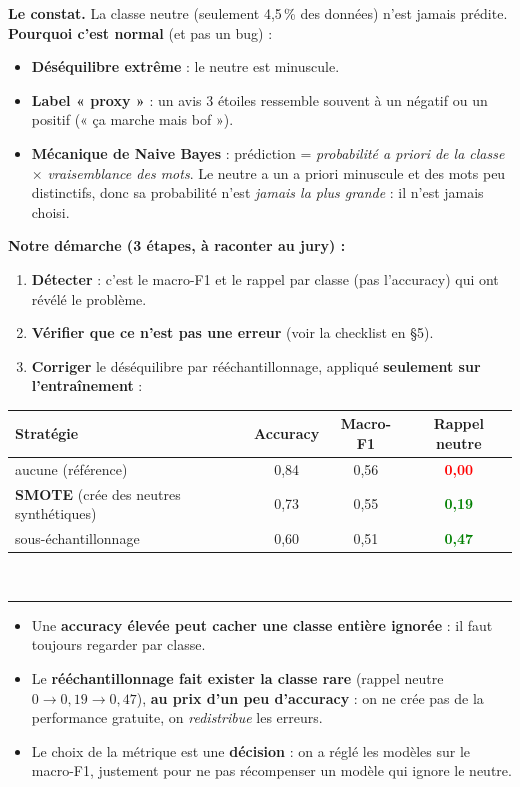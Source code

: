 \documentclass[10.5pt,a4paper]{article}
\newcommand{\sect}[1]{\vspace{0.3em}{\color{primary}\large\bfseries #1}\\[-0.4em]
  {\color{accent}\rule{\linewidth}{1pt}}\par}
\begin{document}
\textbf{Le constat.} La classe neutre (seulement 4,5\,\% des données) n'est jamais prédite.
\textbf{Pourquoi c'est normal} (et pas un bug) :
\begin{itemize}[leftmargin=1.3em,itemsep=1pt,topsep=2pt]
\item \textbf{Déséquilibre extrême} : le neutre est minuscule.
\item \textbf{Label « proxy »} : un avis 3 étoiles ressemble souvent à un négatif ou un positif (« ça marche mais bof »).
\item \textbf{Mécanique de Naive Bayes} : prédiction = \emph{probabilité a priori de la classe} $\times$ \emph{vraisemblance des mots}. Le neutre a un a priori minuscule et des mots peu distinctifs, donc sa probabilité n'est \emph{jamais la plus grande} : il n'est jamais choisi.
\end{itemize}

\textbf{Notre démarche (3 étapes, à raconter au jury) :}
\begin{enumerate}[leftmargin=1.5em,itemsep=1pt,topsep=2pt]
\item \textbf{Détecter} : c'est le macro-F1 et le rappel par classe (pas l'accuracy) qui ont révélé le problème.
\item \textbf{Vérifier que ce n'est pas une erreur} (voir la checklist en §5).
\item \textbf{Corriger} le déséquilibre par rééchantillonnage, appliqué \textbf{seulement sur l'entraînement} :
\end{enumerate}

\begin{center}
\begin{tabular}{lccc}
\toprule
Stratégie & Accuracy & Macro-F1 & \textbf{Rappel neutre} \\
\midrule
aucune (référence) & 0,84 & 0,56 & \textcolor{red}{\textbf{0,00}} \\
\textbf{SMOTE} (crée des neutres synthétiques) & 0,73 & 0,55 & \textcolor{green}{\textbf{0,19}} \\
sous-échantillonnage & 0,60 & 0,51 & \textcolor{green}{\textbf{0,47}} \\
\bottomrule
\end{tabular}
\end{center}

\sect{4. Conclusions à en tirer}

\begin{itemize}[leftmargin=1.3em,itemsep=1pt,topsep=2pt]
\item Une \textbf{accuracy élevée peut cacher une classe entière ignorée} : il faut toujours regarder par classe.
\item Le \textbf{rééchantillonnage fait exister la classe rare} (rappel neutre $0 \to 0{,}19 \to 0{,}47$), \textbf{au prix d'un peu d'accuracy} : on ne crée pas de la performance gratuite, on \emph{redistribue} les erreurs.
\item Le choix de la métrique est une \textbf{décision} : on a réglé les modèles sur le macro-F1, justement pour ne pas récompenser un modèle qui ignore le neutre.
\end{itemize}
\end{document}
